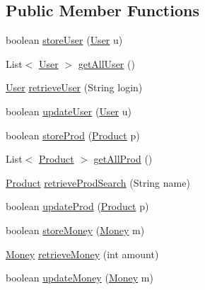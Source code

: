\subsection*{Public Member Functions}
\begin{DoxyCompactItemize}
\item 
boolean \hyperlink{interfacees_1_1deusto_1_1server_1_1db_1_1dao_1_1_i_d_a_o_ab943216560f43595a852b406dcd394a4}{store\+User} (\hyperlink{classes_1_1deusto_1_1server_1_1db_1_1data_1_1_user}{User} u)
\item 
List$<$ \hyperlink{classes_1_1deusto_1_1server_1_1db_1_1data_1_1_user}{User} $>$ \hyperlink{interfacees_1_1deusto_1_1server_1_1db_1_1dao_1_1_i_d_a_o_affa6fc846698427199cb7305155a95c7}{get\+All\+User} ()
\item 
\hyperlink{classes_1_1deusto_1_1server_1_1db_1_1data_1_1_user}{User} \hyperlink{interfacees_1_1deusto_1_1server_1_1db_1_1dao_1_1_i_d_a_o_a19f9b0d0b6f5f80730d6d197deca7dfc}{retrieve\+User} (String login)
\item 
boolean \hyperlink{interfacees_1_1deusto_1_1server_1_1db_1_1dao_1_1_i_d_a_o_a790b00e2989b634c1bbb2c6620ff3583}{update\+User} (\hyperlink{classes_1_1deusto_1_1server_1_1db_1_1data_1_1_user}{User} u)
\item 
boolean \hyperlink{interfacees_1_1deusto_1_1server_1_1db_1_1dao_1_1_i_d_a_o_a1f6d1e58c88fb3a24021f94de5e70056}{store\+Prod} (\hyperlink{classes_1_1deusto_1_1server_1_1db_1_1data_1_1_product}{Product} p)
\item 
List$<$ \hyperlink{classes_1_1deusto_1_1server_1_1db_1_1data_1_1_product}{Product} $>$ \hyperlink{interfacees_1_1deusto_1_1server_1_1db_1_1dao_1_1_i_d_a_o_a5a3e4739557f0af9060b4ca90e69c0e3}{get\+All\+Prod} ()
\item 
\hyperlink{classes_1_1deusto_1_1server_1_1db_1_1data_1_1_product}{Product} \hyperlink{interfacees_1_1deusto_1_1server_1_1db_1_1dao_1_1_i_d_a_o_a9ba3fce5b0679bb1068484734fe0ed02}{retrieve\+Prod\+Search} (String name)
\item 
boolean \hyperlink{interfacees_1_1deusto_1_1server_1_1db_1_1dao_1_1_i_d_a_o_afc4634e403796a1b66fc5251b5b86d1e}{update\+Prod} (\hyperlink{classes_1_1deusto_1_1server_1_1db_1_1data_1_1_product}{Product} p)
\item 
boolean \hyperlink{interfacees_1_1deusto_1_1server_1_1db_1_1dao_1_1_i_d_a_o_a0c952a7cac366a448451d8150a8d57e4}{store\+Money} (\hyperlink{classes_1_1deusto_1_1server_1_1db_1_1data_1_1_money}{Money} m)
\item 
\hyperlink{classes_1_1deusto_1_1server_1_1db_1_1data_1_1_money}{Money} \hyperlink{interfacees_1_1deusto_1_1server_1_1db_1_1dao_1_1_i_d_a_o_a1386c2e329277fc36575b0450a0e8997}{retrieve\+Money} (int amount)
\item 
boolean \hyperlink{interfacees_1_1deusto_1_1server_1_1db_1_1dao_1_1_i_d_a_o_a2a4641aeefc28dc979e0146e8ca73342}{update\+Money} (\hyperlink{classes_1_1deusto_1_1server_1_1db_1_1data_1_1_money}{Money} m)
\end{DoxyCompactItemize}


